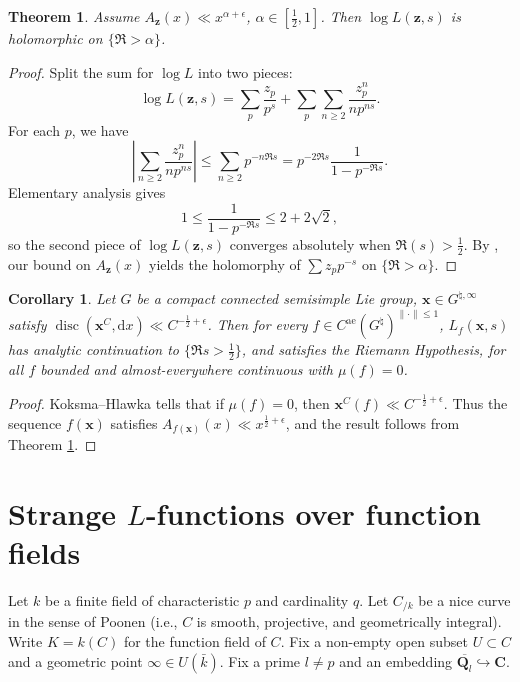 \documentclass{article}
\DeclareMathOperator{\disc}{disc}
\newcommand{\bC}{\mathbf{C}}
\newcommand{\bQ}{\mathbf{Q}}
\newcommand{\bx}{{\boldsymbol x}}
\newcommand{\bz}{{\boldsymbol z}}
\newcommand{\alev}{\mathrm{ae}}
\newcommand{\dd}{\mathrm{d}}
\newtheorem{theorem}[subsection]{Theorem}
\newtheorem{corollary}[subsection]{Corollary}
\theoremstyle{definition}
\begin{document}
\begin{theorem}\label{thm:main-for-sequences}
Assume $A_\bz(x) \ll x^{\alpha +\epsilon}$, $\alpha\in [\frac 1 2,1]$. 
Then $\log L(\bz,s)$ is holomorphic on $\{\Re>\alpha\}$.
\end{theorem}
\begin{proof}
Split the sum for $\log L$ into two pieces:
\[
	\log L(\bz,s) = \sum_p \frac{z_p}{p^s} + \sum_p \sum_{n\geqslant 2} \frac{z_p^n}{n p^{n s}} .
\]
For each $p$, we have 
\[
	\left|\sum_{n\geqslant 2} \frac{z_p^n}{n p^{ns}} \right| \leqslant \sum_{n\geqslant 2} p^{-n \Re s} = p^{-2\Re s} \frac{1}{1-p^{-\Re s}} .
\]
Elementary analysis gives 
\[
	1 \leqslant \frac{1}{1-p^{-\Re s}} \leqslant 2+2\sqrt 2 ,
\]
so the second piece of $\log L(\bz,s)$ converges absolutely when 
$\Re(s)>\frac 1 2$. By \cite[II.1 Th.10]{tenenbaum-1995}, our bound on 
$A_\bz(x)$ yields the holomorphy of $\sum z_p p^{-s}$ on $\{\Re >\alpha\}$. 
\end{proof}

\begin{corollary}\label{cor:ATRH}
Let $G$ be a compact connected semisimple Lie group, 
$\bx\in G^{\natural,\infty}$ satisfy 
$\disc(\bx^C,\dd x)\ll C^{-\frac 1 2+\epsilon}$. Then for every 
$f\in C^\alev(G^\natural)^{\|\cdot\|\leqslant 1}$, 
$L_f(\bx,s)$ has analytic continuation to $\{\Re s>\frac 1 2\}$, and satisfies 
the Riemann Hypothesis, for all $f$ bounded and almost-everywhere continuous 
with $\mu(f)=0$. 
\end{corollary}
\begin{proof}
Koksma--Hlawka tells that if $\mu(f)=0$, then 
$\bx^C(f)\ll C^{-\frac 1 2+\epsilon}$. Thus the sequence 
$f(\bx)$ satisfies $A_{f(\bx)}(x) \ll x^{\frac 1 2+\epsilon}$, and the result 
follows from Theorem \ref{thm:main-for-sequences}. 
\end{proof}





\section{Strange $L$-functions over function fields}\label{sec:function-field}

Let $k$ be a finite field of characteristic $p$ and cardinality $q$. Let 
$C_{/k}$ be a nice curve in the sense of Poonen (i.e., $C$ is smooth, 
projective, and geometrically integral). Write $K=k(C)$ for the function field 
of $C$. Fix a non-empty open subset $U\subset C$ and a geometric point 
$\infty\in U(\bar k)$. Fix a prime $l\ne p$ and an embedding 
$\overline{\bQ_l}\hookrightarrow \bC$. 
\end{document}
